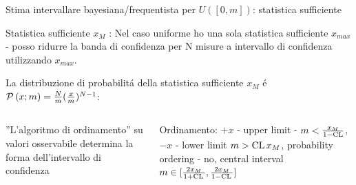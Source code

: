 \documentclass[asd-beamer.tex]{subfiles}%
\begin{document}
\begin{wordonframe}{Stima intervallare bayesiana/frequentista per $U([0,m])$: statistica sufficiente}
\begin{block}{Statistica sufficiente $x_M$}
: Nel caso uniforme ho una sola statistica sufficiente $x_{max}$ - posso ridurre la banda di confidenza per N misure a intervallo di confidenza utilizzando $x_{max}$.
\end{block}

La distribuzione di probabilit\'a della statistica sufficiente $x_M$ \'e $\operatorname{\mathcal{P}}{(x;m)}=\frac{N}{m}(\frac{x}{m})^{N-1}$:
\begin{columns}[T]
\begin{column}{0.5\textwidth}
''L'algoritmo di ordinamento'' su valori osservabile determina la forma dell'intervallo di confidenza
\end{column}
\begin{column}{0.5\textwidth}
Ordinamento:
$+x$ - upper limit - $m<\frac{x_M}{1-\operatorname{CL}}$, $-x$ - lower limit $m>\operatorname{CL}{}x_M$, probability ordering - no, central interval $m\in[\frac{2x_M}{1+\operatorname{CL}{}},\frac{2x_M}{1-\operatorname{CL}{}}]$
\end{column}
\end{columns}
\end{wordonframe}
\end{document}
